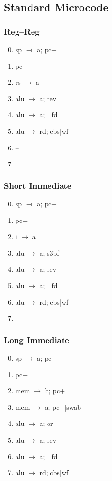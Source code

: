 \documentclass[11pt]{book}
\begin{document}
\subsection*{Standard Microcode}
\begin{multicols}{3}\ttfamily\selectfont\small
  \subsubsection*{Reg--Reg}
  \begin{enumerate}\setcounter{enumi}{-1}
  \item sp \(\rightarrow\) a; pc+
  \item pc+
  \item rs \(\rightarrow\) a
  \item alu \(\rightarrow\) a; rev
  \item alu \(\rightarrow\) a; \(\neg\)fd
  \item alu \(\rightarrow\) rd; cbs|wf
  \item --
  \item --
  \end{enumerate}
  \columnbreak
  \subsubsection*{Short Immediate}
  \begin{enumerate}\setcounter{enumi}{-1}
  \item sp \(\rightarrow\) a; pc+
  \item pc+
  \item i \(\rightarrow\) a
  \item alu \(\rightarrow\) a; s3bf
  \item alu \(\rightarrow\) a; rev
  \item alu \(\rightarrow\) a; \(\neg\)fd
  \item alu \(\rightarrow\) rd; cbs|wf
  \item --
  \end{enumerate}
  \columnbreak
  \subsubsection*{Long Immediate}
  \begin{enumerate}\setcounter{enumi}{-1}
  \item sp \(\rightarrow\) a; pc+
  \item pc+
  \item mem \(\rightarrow\) b; pc+
  \item mem \(\rightarrow\) a; pc+|swab
  \item alu \(\rightarrow\) a; or
  \item alu \(\rightarrow\) a; rev
  \item alu \(\rightarrow\) a; \(\neg\)fd
  \item alu \(\rightarrow\) rd; cbs|wf
  \end{enumerate}
\end{multicols}
\end{document}
